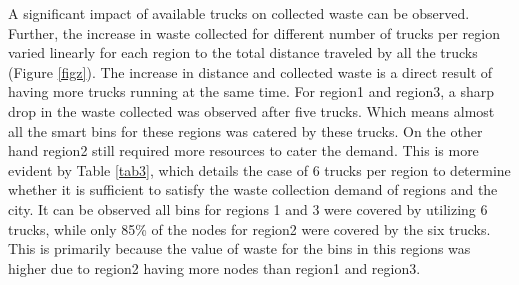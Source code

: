 \documentclass[12pt]{article}
\begin{document}
A significant impact of available trucks on collected waste can be observed. Further, the increase in waste collected for different number of trucks per region varied linearly for each region to the total distance traveled by all the trucks (Figure \ref{figz}). The increase in distance and collected waste is a direct result of having more trucks running at the same time. For region1 and region3, a sharp drop in the waste collected was observed after five trucks. Which means almost all the smart bins for these regions was catered by these trucks. On the other hand region2 still required more resources to cater the demand. This is more evident by Table \ref{tab3}, which details the case of 6 trucks per region to determine whether it is sufficient to satisfy the waste collection demand of regions and the city. It can be observed all bins for regions 1 and 3 were covered by utilizing 6 trucks, while only 85\% of the nodes for region2 were covered by the six trucks. This is primarily because the value of waste for the bins in this regions was higher due to region2 having more nodes than region1 and region3.
\end{document}
